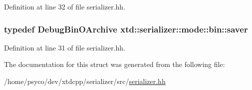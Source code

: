 Definition at line 32 of file serializer.\+hh.

\subsubsection[{\texorpdfstring{saver}{saver}}]{\setlength{\rightskip}{0pt plus 5cm}typedef {\bf Debug\+Bin\+O\+Archive} {\bf xtd\+::serializer\+::mode\+::bin\+::saver}}\hypertarget{structxtd_1_1serializer_1_1mode_1_1bin_a796ef43a002a185030eed66012cf57fb}{}\label{structxtd_1_1serializer_1_1mode_1_1bin_a796ef43a002a185030eed66012cf57fb}


Definition at line 31 of file serializer.\+hh.



The documentation for this struct was generated from the following file\+:\begin{DoxyCompactItemize}
\item 
/home/psyco/dev/xtdcpp/serializer/src/\hyperlink{serializer_8hh}{serializer.\+hh}\end{DoxyCompactItemize}

